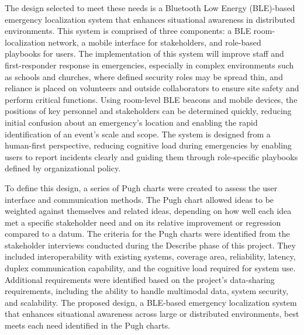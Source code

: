 \documentclass[english,12pt,a4paper,titlepage]{article}
\begin{document}
	The design selected to meet these needs is a Bluetooth Low Energy (BLE)-based emergency localization system that enhances situational awareness in distributed environments. This system is comprised of three components: a BLE room-localization network, a mobile interface for stakeholders, and role-based playbooks for users. The implementation of this system will improve staff and first-responder response in emergencies, especially in complex environments such as schools and churches, where defined security roles may be spread thin, and reliance is placed on volunteers and outside collaborators to ensure site safety and perform critical functions. Using room-level BLE beacons and mobile devices, the positions of key personnel and stakeholders can be determined quickly, reducing initial confusion about an emergency's location and enabling the rapid identification of an event's scale and scope. The system is designed from a human-first perspective, reducing cognitive load during emergencies by enabling users to report incidents clearly and guiding them through role-specific playbooks defined by organizational policy. 
	
	To define this design, a series of Pugh charts were created to assess the user interface and communication methods. The Pugh chart allowed ideas to be weighted against themselves and related ideas, depending on how well each idea met a specific stakeholder need and on its relative improvement or regression compared to a datum. The criteria for the Pugh charts were identified from the stakeholder interviews conducted during the Describe phase of this project. They included interoperability with existing systems, coverage area, reliability, latency, duplex communication capability, and the cognitive load required for system use. Additional requirements were identified based on the project's data-sharing requirements, including the ability to handle multimodal data, system security, and scalability. The proposed design, a BLE-based emergency localization system that enhances situational awareness across large or distributed environments, best meets each need identified in the Pugh charts.
	
\end{document}

